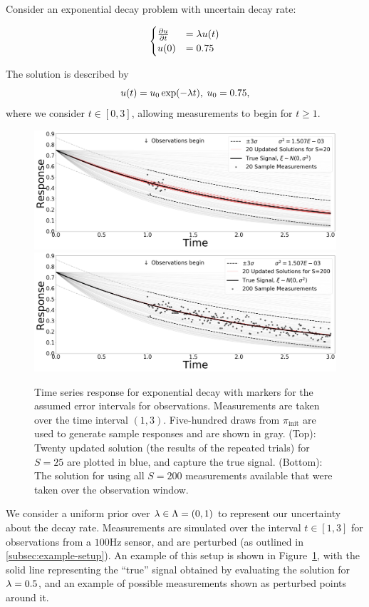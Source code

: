 Consider an exponential decay problem with uncertain decay rate:

$$
\begin{cases}
\frac{\partial u}{\partial t} & = \lambda u(t) \\ u(0) &= 0.75
\end{cases}
$$

The solution is described by
\begin{equation}
  u(t) = u_0\exp(-\lambda t), \; u_0 = 0.75 ,
\end{equation}
where we consider $t \in [0, 3]$, allowing measurements to begin for $t\geq 1$.
\begin{figure}[htbp]
  \includegraphics[width=\linewidth]{figures/ode/ode_20_reference_solution}
  \includegraphics[width=\linewidth]{figures/ode/ode_200_reference_solution}
  \caption{Time series response for exponential decay with markers for the assumed error intervals for observations.
  Measurements are taken over the time interval $(1,3)$.
  Five-hundred draws from $\pi_\text{init}$ are used to generate sample responses and are shown in gray.
  (Top): Twenty updated solution (the results of the repeated trials) for $S=25$ are plotted in blue, and capture the true signal.
  (Bottom): The solution for using all $S=200$ measurements available that were taken over the observation window.
  }
  \label{fig:ode-reference}
\end{figure}

We consider a uniform prior over $\lambda \in \Lambda = (0, 1)$ to represent our uncertainty about the decay rate.
Measurements are simulated over the interval $t \in [1,3]$ for observations from a $100$Hz sensor, and are perturbed (as outlined in \ref{subsec:example-setup}).
An example of this setup is shown in Figure~\ref{fig:ode-reference}, with the solid line representing the ``true'' signal obtained by evaluating the solution for $\lambda = 0.5$, and an example of possible measurements shown as perturbed points around it.



